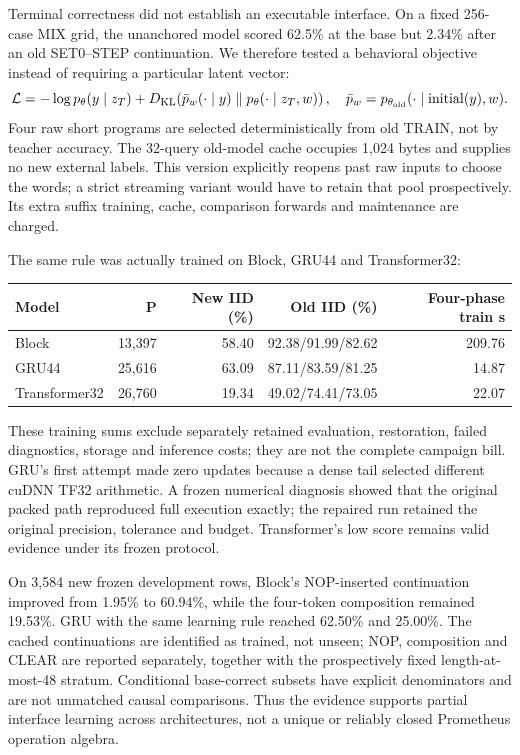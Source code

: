 Terminal correctness did not establish an executable interface. On a fixed
256-case MIX grid, the unanchored model scored 62.5\% at the base but
2.34\% after an old SET0--STEP continuation. We therefore tested a
behavioral objective instead of requiring a particular latent vector:
\begin{equation}
\mathcal L=-\log p_\theta(y\mid z_T)+
 D_{\rm KL}\!\left(\bar p_w(\cdot\mid y)
 \parallel p_\theta(\cdot\mid z_T,w)\right),\quad
\bar p_w=p_{\theta_{\rm old}}(\cdot\mid\operatorname{initial}(y),w).
\end{equation}
Four raw short programs are selected deterministically from old TRAIN,
not by teacher accuracy. The 32-query old-model cache occupies 1,024
bytes and supplies no new external labels. This version explicitly
reopens past raw inputs to choose the words; a strict streaming variant
would have to retain that pool prospectively. Its extra suffix training,
cache, comparison forwards and maintenance are charged.

The same rule was actually trained on Block, GRU44 and Transformer32:
\begin{center}\small
\begin{tabular}{lrrrr}
\toprule
Model & P & New IID (\%) & Old IID (\%) & Four-phase train s\\
\midrule
Block & 13,397 & 58.40 & 92.38/91.99/82.62 & 209.76\\
GRU44 & 25,616 & 63.09 & 87.11/83.59/81.25 & 14.87\\
Transformer32 & 26,760 & 19.34 & 49.02/74.41/73.05 & 22.07\\
\bottomrule
\end{tabular}
\end{center}
These training sums exclude separately retained evaluation, restoration,
failed diagnostics, storage and inference costs; they are not the complete
campaign bill. GRU's first attempt made zero updates because a dense tail
selected different cuDNN TF32 arithmetic. A frozen numerical diagnosis
showed that the original packed path reproduced full execution exactly;
the repaired run retained the original precision, tolerance and budget.
Transformer's low score remains valid evidence under its frozen protocol.

On 3,584 new frozen development rows, Block's NOP-inserted continuation
improved from 1.95\% to 60.94\%, while the four-token composition remained
19.53\%. GRU with the same learning rule reached 62.50\% and 25.00\%.
The cached continuations are identified as trained, not unseen; NOP,
composition and CLEAR are reported separately, together with the
prospectively fixed length-at-most-48 stratum. Conditional base-correct
subsets have explicit denominators and are not unmatched causal comparisons.
Thus the evidence supports partial interface learning across architectures,
not a unique or reliably closed Prometheus operation algebra.

